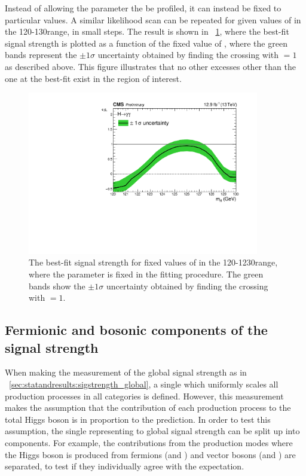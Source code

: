 Instead of allowing the \mH parameter the be profiled, it can instead be fixed to particular values. A similar likelihood scan can be repeated for given values of \mH in the 120-130\GeV range, in small steps. The result is shown in \Fig~\ref{fig:statandresults:mu_vs_mh}, where the best-fit signal strength is plotted as a function of the fixed value of \mH, where the green bands represent the $\pm 1 \sigma$ uncertainty obtained by finding the crossing with \DNLL$=1$ as described above. This figure illustrates that no other excesses other than the one at the best-fit exist in the region of interest.  

\begin{figure}[ht!]
\centering
\includegraphics[width=0.9\textwidth]{statandresultsFigures/MuHat_vs_MH.pdf} 
\caption{The best-fit signal strength for fixed values of \mH in the 120-1230\GeV range, where the \mH parameter is fixed in the fitting procedure. The green bands show  the $\pm 1 \sigma$ uncertainty obtained by finding the crossing with \DNLL$=1$.  }

\label{fig:statandresults:mu_vs_mh}
\end{figure}

\subsection{Fermionic and bosonic components of the signal strength}
\label{sec:statandresults:rvrf}

When making the measurement of the global signal strength as in \Sec~\ref{sec:statandresults:sigstrength_global}, a single \POI which uniformly scales all production processes in all categories is defined. However, this measurement makes the assumption that the contribution of each production process to the total Higgs boson \crosssection is in proportion to the \SM prediction. In order to test this assumption, the single \POI representing to global signal strength can be split up into components. For example, the contributions from the production modes where the Higgs boson is produced from fermions (\ggH and \ttH) and vector bosons (\VBF and \VH) are separated, to test if they individually agree with the \SM expectation.


